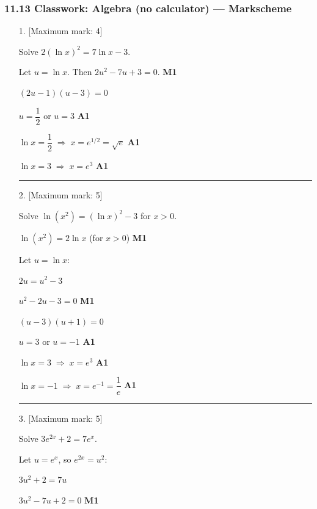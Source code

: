 \documentclass[12pt, twoside]{article}
\begin{document}
\subsubsection*{11.13 Classwork: Algebra (no calculator) --- Markscheme}

\begin{enumerate}[itemsep=0.3cm]

\item[1.] [Maximum mark: 4]

Solve $2(\ln x)^2 = 7\ln x - 3$.

\medskip

Let $u = \ln x$. Then $2u^2 - 7u + 3 = 0$. \hfill \textbf{M1}

$(2u - 1)(u - 3) = 0$

$u = \dfrac{1}{2}$ or $u = 3$ \hfill \textbf{A1}

$\ln x = \dfrac{1}{2} \;\Rightarrow\; x = e^{1/2} = \sqrt{e}$ \hfill \textbf{A1}

$\ln x = 3 \;\Rightarrow\; x = e^3$ \hfill \textbf{A1}

\bigskip
\hrule
\bigskip

\item[2.] [Maximum mark: 5]

Solve $\ln(x^2) = (\ln x)^2 - 3$ for $x > 0$.

\medskip

$\ln(x^2) = 2\ln x$ \quad (for $x > 0$) \hfill \textbf{M1}

Let $u = \ln x$:

$2u = u^2 - 3$

$u^2 - 2u - 3 = 0$ \hfill \textbf{M1}

$(u - 3)(u + 1) = 0$

$u = 3$ or $u = -1$ \hfill \textbf{A1}

$\ln x = 3 \;\Rightarrow\; x = e^3$ \hfill \textbf{A1}

$\ln x = -1 \;\Rightarrow\; x = e^{-1} = \dfrac{1}{e}$ \hfill \textbf{A1}

\bigskip
\hrule
\bigskip

\item[3.] [Maximum mark: 5]

Solve $3e^{2x} + 2 = 7e^x$.

\medskip

Let $u = e^x$, so $e^{2x} = u^2$:

$3u^2 + 2 = 7u$

$3u^2 - 7u + 2 = 0$ \hfill \textbf{M1}


\end{enumerate}
\end{document}
